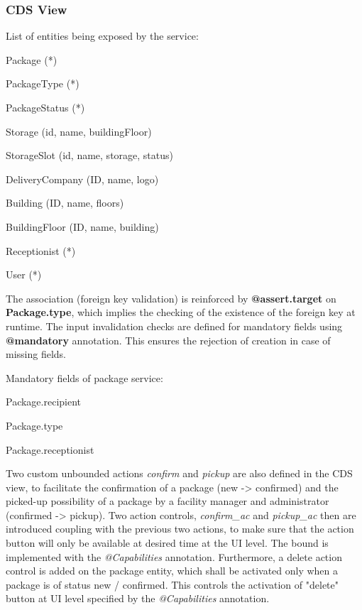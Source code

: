 \subsubsection{CDS View}

\noindent
List of entities being exposed by the service:
\begin{compactenum}
	\item Package (*)
    \item PackageType (*)
    \item PackageStatus (*)
    \item Storage (id, name, buildingFloor)
    \item StorageSlot (id, name, storage, status)
    \item DeliveryCompany (ID, name, logo)
    \item Building (ID, name, floors)
    \item BuildingFloor (ID, name, building)
    \item Receptionist (*)
    \item User (*)
\end{compactenum}

\bigskip
The association (foreign key validation) is reinforced by \textbf{@assert.target} on \textbf{Package.type}, which implies the checking of the existence of the foreign key at runtime. The input invalidation checks are defined for mandatory fields using \textbf{@mandatory} annotation. This ensures the rejection of creation in case of missing fields. 

\bigskip
\noindent
Mandatory fields of package service:
\begin{compactenum}
	\item Package.recipient
    \item Package.type
    \item Package.receptionist
\end{compactenum}


\bigskip
Two custom unbounded actions \textit{confirm} and \textit{pickup} are also defined in the CDS view, to facilitate the confirmation of a package (new -> confirmed) and the picked-up possibility of a package by a facility manager and administrator (confirmed -> pickup). Two action controls, \textit{confirm\_ac} and \textit{pickup\_ac} then are introduced coupling with the previous two actions, to make sure that the action button will only be available at desired time at the UI level. The bound is implemented with the \textit{@Capabilities} annotation. Furthermore, a delete action control is added on the package entity, which shall be activated only when a package is of status new / confirmed. This controls the activation of "delete" button at UI level specified by the \textit{@Capabilities} annotation. 


